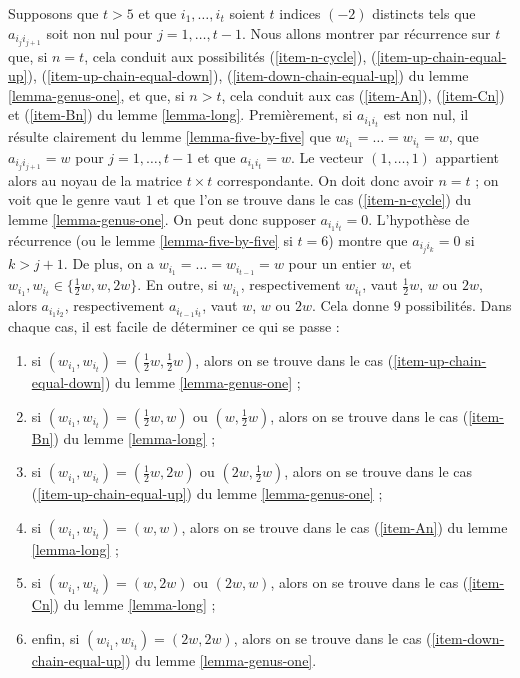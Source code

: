 \noindent
Supposons que $t > 5$ et que $i_1, \ldots, i_t$ soient $t$ indices $(-2)$ distincts
tels que $a_{i_ji_{j + 1}}$ soit non nul pour $j = 1, \ldots, t - 1$. Nous allons
montrer par récurrence sur $t$ que, si $n = t$, cela conduit aux possibilités
(\ref{item-n-cycle}), (\ref{item-up-chain-equal-up}),
(\ref{item-up-chain-equal-down}), (\ref{item-down-chain-equal-up})
du lemme \ref{lemma-genus-one}, et que, si $n > t$, cela conduit aux cas
(\ref{item-An}), (\ref{item-Cn}) et (\ref{item-Bn}) du
lemme \ref{lemma-long}.
Premièrement, si $a_{i_1i_t}$ est non nul, il résulte clairement
du lemme \ref{lemma-five-by-five} que
$w_{i_1} = \ldots = w_{i_t} = w$, que
$a_{i_ji_{j + 1}} = w$ pour $j = 1, \ldots, t - 1$ et que
$a_{i_1i_t} = w$. Le vecteur $(1, \ldots, 1)$ appartient alors au noyau
de la matrice $t \times t$ correspondante. On doit donc avoir $n = t$ ;
on voit que le genre vaut $1$ et que l'on se trouve
dans le cas (\ref{item-n-cycle}) du lemme \ref{lemma-genus-one}.
On peut donc supposer $a_{i_1i_t} = 0$.
L'hypothèse de récurrence (ou le lemme \ref{lemma-five-by-five} si $t = 6$)
montre que $a_{i_ji_k} = 0$ si $k > j + 1$.
De plus, on a $w_{i_1} = \ldots = w_{i_{t - 1}} = w$
pour un entier $w$, et $w_{i_1}, w_{i_t} \in \{\frac{1}{2}w, w, 2w\}$.
En outre, si $w_{i_1}$, respectivement $w_{i_t}$, vaut
$\frac{1}{2}w$, $w$ ou $2w$, alors
$a_{i_1i_2}$, respectivement $a_{i_{t - 1}i_t}$,
vaut $w$, $w$ ou $2w$. Cela donne $9$ possibilités.
Dans chaque cas, il est facile de déterminer ce qui se passe :
\begin{enumerate}
\item si $(w_{i_1}, w_{i_t}) = (\frac{1}{2}w, \frac{1}{2}w)$, alors
on se trouve dans le cas (\ref{item-up-chain-equal-down}) du
lemme \ref{lemma-genus-one} ;
\item si $(w_{i_1}, w_{i_t}) = (\frac{1}{2}w, w)$ ou $(w, \frac{1}{2}w)$,
alors on se trouve dans le cas (\ref{item-Bn}) du lemme \ref{lemma-long} ;
\item si $(w_{i_1}, w_{i_t}) = (\frac{1}{2}w, 2w)$ ou $(2w, \frac{1}{2}w)$,
alors on se trouve dans le cas (\ref{item-up-chain-equal-up}) du
lemme \ref{lemma-genus-one} ;
\item si $(w_{i_1}, w_{i_t}) = (w, w)$, alors on se trouve dans le cas
(\ref{item-An}) du lemme \ref{lemma-long} ;
\item si $(w_{i_1}, w_{i_t}) = (w, 2w)$ ou $(2w, w)$, alors on se trouve
dans le cas (\ref{item-Cn}) du lemme \ref{lemma-long} ;
\item enfin, si $(w_{i_1}, w_{i_t}) = (2w, 2w)$, alors on se trouve dans le cas
(\ref{item-down-chain-equal-up}) du lemme \ref{lemma-genus-one}.
\end{enumerate}

